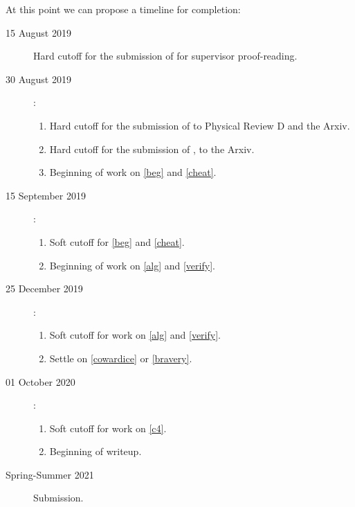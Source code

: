 \documentclass[twoside]{report}
\begin{document}
\begin{multicols}{2}
\begin{enumerate}[resume]
    At this point we can propose a timeline for completion:
\begin{description}
  \item[15 August 2019] Hard cutoff for the submission of \cite{paper-2} for supervisor proof-reading.
  \item[30 August 2019] :
    \begin{enumerate}
      \item Hard cutoff for the submission of \cite{paper-2} to Physical Review D and the Arxiv.
      \item Hard cutoff for the submission of \cite{dictionary}, to the Arxiv.
      \item Beginning of work on \ref{beg} and \ref{cheat}.
    \end{enumerate}
  \item[15 September 2019] :
    \begin{enumerate}
      \item Soft cutoff for \ref{beg} and \ref{cheat}.
      \item Beginning of work on \ref{alg} and \ref{verify}.
    \end{enumerate}
  \item[25 December 2019] :
    \begin{enumerate}
      \item Soft cutoff for work on \ref{alg} and \ref{verify}.
      \item Settle on \ref{cowardice} or \ref{bravery}.
    \end{enumerate}
  \item[01 October 2020] :
    \begin{enumerate}
      \item Soft cutoff for work on \ref{c4}.
      \item Beginning of writeup.
    \end{enumerate}
  \item[Spring-Summer 2021] Submission.
\end{description}
\end{enumerate}
\end{multicols}
\hline
\end{document}

